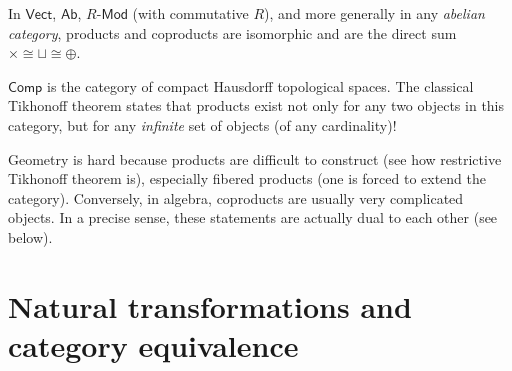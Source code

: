 \begin{example}
    In $\mathsf{Vect}$, $\mathsf{Ab}$, $R\text{-}\mathsf{Mod}$ (with commutative $R$), and more generally in any \emph{abelian category}, products and coproducts are isomorphic and are the direct sum $\times\cong\sqcup\cong\oplus$.
\end{example}
%
\begin{example}
    $\mathsf{Comp}$ is the category of compact Hausdorff topological
    spaces. The classical Tikhonoff theorem states that products exist
    not only for any two objects in this category, but for any \emph{infinite}
    set of objects (of any cardinality)!
\end{example}
%
\begin{rem}
    Geometry is hard because products are difficult to construct (see
    how restrictive Tikhonoff theorem is), especially fibered products
    (one is forced to extend the category). Conversely, in algebra, coproducts
    are usually very complicated objects. In a precise sense, these statements
    are actually dual to each other (see below).
\end{rem}



\section{Natural transformations and category equivalence}


